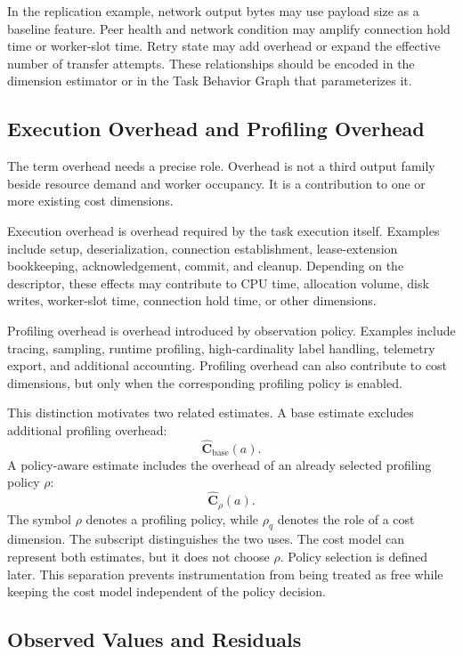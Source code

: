 In the replication example, network output bytes may use payload size as a
baseline feature. Peer health and network condition may amplify connection hold
time or worker-slot time. Retry state may add overhead or expand the effective
number of transfer attempts. These relationships should be encoded in the
dimension estimator or in the Task Behavior Graph that parameterizes it.

\subsection{Execution Overhead and Profiling Overhead}
\label{sec:cost-overhead-types}

The term overhead needs a precise role. Overhead is not a third output family
beside resource demand and worker occupancy. It is a contribution to one or
more existing cost dimensions.

Execution overhead is overhead required by the task execution itself. Examples
include setup, deserialization, connection establishment, lease-extension
bookkeeping, acknowledgement, commit, and cleanup. Depending on the descriptor,
these effects may contribute to CPU time, allocation volume, disk writes,
worker-slot time, connection hold time, or other dimensions.

Profiling overhead is overhead introduced by observation policy. Examples
include tracing, sampling, runtime profiling, high-cardinality label handling,
telemetry export, and additional accounting. Profiling overhead can also
contribute to cost dimensions, but only when the corresponding profiling policy
is enabled.

This distinction motivates two related estimates. A base estimate excludes
additional profiling overhead:
\[
\widehat{\mathbf{C}}_{\mathrm{base}}(a).
\]
A policy-aware estimate includes the overhead of an already selected profiling
policy $\rho$:
\[
\widehat{\mathbf{C}}_{\rho}(a).
\]
The symbol $\rho$ denotes a profiling policy, while $\rho_q$ denotes the role of
a cost dimension. The subscript distinguishes the two uses. The cost model can
represent both estimates, but it does not choose $\rho$. Policy selection is
defined later. This separation prevents instrumentation from being treated as
free while keeping the cost model independent of the policy decision.

\subsection{Observed Values and Residuals}
\label{sec:cost-residuals-usage}

